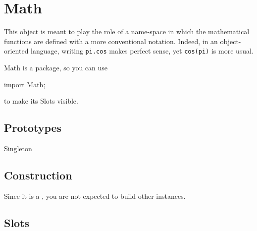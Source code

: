 
\section{Math}

This object is meant to play the role of a name-space in which the
mathematical functions are defined with a more conventional notation.
Indeed, in an object-oriented language, writing \lstinline|pi.cos| makes
perfect sense, yet \lstinline|cos(pi)| is more usual.

Math is a package, so you can use

\begin{urbiscript}
import Math;
\end{urbiscript}

to make its Slots visible.


\subsection{Prototypes}
\begin{refObjects}
\item[Singleton]
\end{refObjects}

\subsection{Construction}

Since it is a , you are not expected to build other
instances.

\subsection{Slots}

